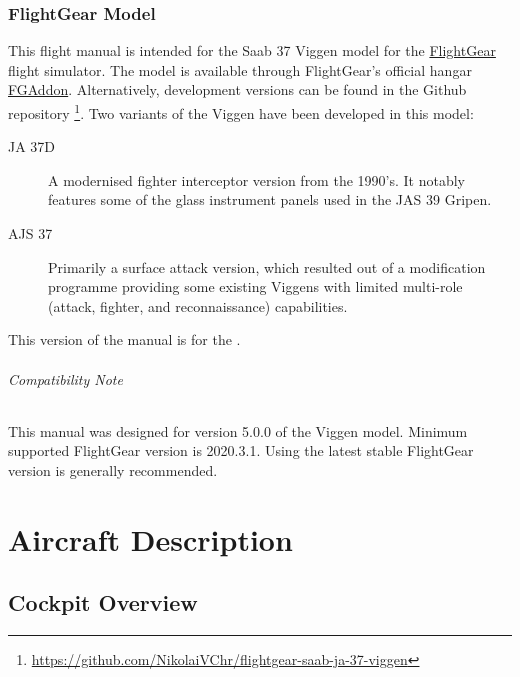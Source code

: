 \documentclass[a4paper]{report}
\newcommand{\variant}{\ifbool{AJS}{AJS 37}{JA 37D}}
\newcommand{\versionnumber}{5.0.0}
\begin{document}
\section*{FlightGear Model}
This flight manual is intended for the Saab 37 Viggen model
for the \href{http://www.flightgear.org}{FlightGear} flight simulator.
The model is available through FlightGear's official hangar
\href{http://wiki.flightgear.org/FGAddon}{FGAddon}.
Alternatively, development versions can be found in the Github repository%
\footnote{\url{https://github.com/NikolaiVChr/flightgear-saab-ja-37-viggen}}.
Two variants of the Viggen have been developed in this model:
\begin{description}
  \item[JA 37D] A modernised fighter interceptor version from the 1990's.
    It notably features some of the glass instrument panels used in the JAS 39 Gripen.
  \item[AJS 37] Primarily a surface attack version,
    which resulted out of a modification programme providing some existing Viggens
    with limited multi-role (attack, fighter, and reconnaissance) capabilities.
\end{description}
This version of the manual is for the \variant{}.

\paragraph*{Compatibility Note}
This manual was designed for version \versionnumber{} of the Viggen model.
Minimum supported FlightGear version is 2020.3.1.
Using the latest stable FlightGear version is generally recommended.


\part{Aircraft Description}
\chapter{Cockpit Overview}
\end{document}
